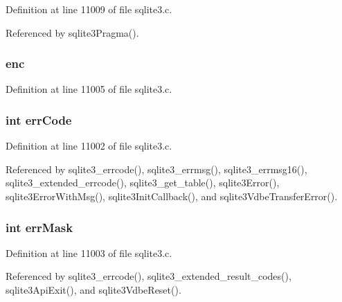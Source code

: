 Definition at line 11009 of file sqlite3.\+c.



Referenced by sqlite3\+Pragma().

\hypertarget{structsqlite3_a9c71ab1f0d39a2b088a6d8a1093159c0}{}
\subsubsection[{enc}]{ enc}\label{structsqlite3_a9c71ab1f0d39a2b088a6d8a1093159c0}


Definition at line 11005 of file sqlite3.\+c.

\hypertarget{structsqlite3_af3fde244c3a673c0a8a0531b7a92c45a}{}
\subsubsection[{err\+Code}]{\setlength{\rightskip}{0pt plus 5cm}int err\+Code}\label{structsqlite3_af3fde244c3a673c0a8a0531b7a92c45a}


Definition at line 11002 of file sqlite3.\+c.



Referenced by sqlite3\+\_\+errcode(), sqlite3\+\_\+errmsg(), sqlite3\+\_\+errmsg16(), sqlite3\+\_\+extended\+\_\+errcode(), sqlite3\+\_\+get\+\_\+table(), sqlite3\+Error(), sqlite3\+Error\+With\+Msg(), sqlite3\+Init\+Callback(), and sqlite3\+Vdbe\+Transfer\+Error().

\hypertarget{structsqlite3_a0f9f4c423c2038dca9fd1a81183e9a86}{}
\subsubsection[{err\+Mask}]{\setlength{\rightskip}{0pt plus 5cm}int err\+Mask}\label{structsqlite3_a0f9f4c423c2038dca9fd1a81183e9a86}


Definition at line 11003 of file sqlite3.\+c.



Referenced by sqlite3\+\_\+errcode(), sqlite3\+\_\+extended\+\_\+result\+\_\+codes(), sqlite3\+Api\+Exit(), and sqlite3\+Vdbe\+Reset().

\hypertarget{structsqlite3_ac8bf36fe0577cba66bccda3a6f7e80a4}{}
